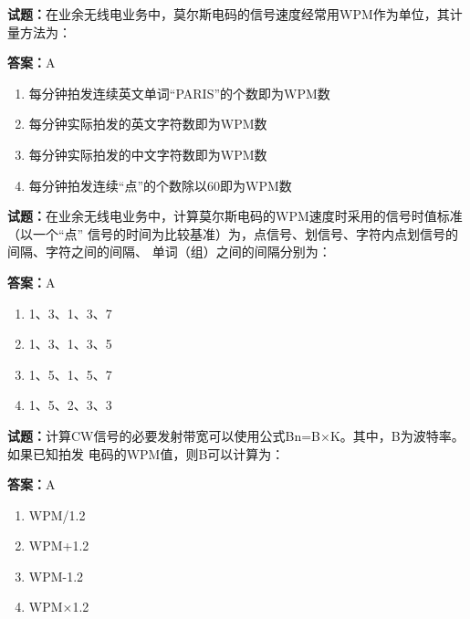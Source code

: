 \documentclass{ctexbook}
\begin{document}
\textbf{试题：}在业余无线电业务中，莫尔斯电码的信号速度经常用WPM作为单位，其计量方法为： 

\textbf{答案：}A 

\begin{enumerate}[leftmargin=3em]
  \item 每分钟拍发连续英文单词“PARIS”的个数即为WPM数 

  \item 每分钟实际拍发的英文字符数即为WPM数 

  \item 每分钟实际拍发的中文字符数即为WPM数 

  \item 每分钟拍发连续“点”的个数除以60即为WPM数 

\end{enumerate}





\vspace{1em}

\textbf{试题：}在业余无线电业务中，计算莫尔斯电码的WPM速度时采用的信号时值标准（以一个“点”
信号的时间为比较基准）为，点信号、划信号、字符内点划信号的间隔、字符之间的间隔、
单词（组）之间的间隔分别为： 

\textbf{答案：}A 

\begin{enumerate}[leftmargin=3em]
  \item 1、3、1、3、7 

  \item 1、3、1、3、5 

  \item 1、5、1、5、7 

  \item 1、5、2、3、3 

\end{enumerate}





\vspace{1em}

\textbf{试题：}计算CW信号的必要发射带宽可以使用公式Bn=B×K。其中，B为波特率。如果已知拍发
电码的WPM值，则B可以计算为： 

\textbf{答案：}A 

\begin{enumerate}[leftmargin=3em]
  \item WPM/1.2 

  \item WPM+1.2 

  \item WPM-1.2 

  \item WPM×1.2 

\end{enumerate}
\end{document}
